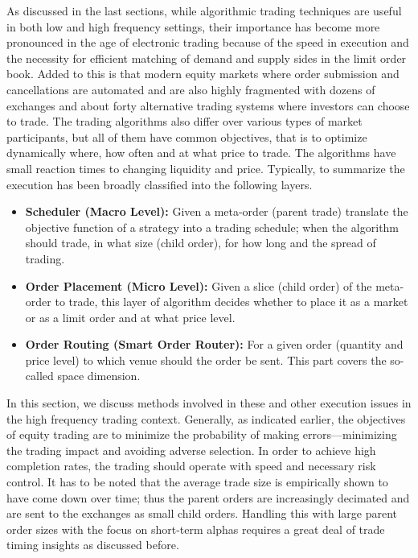 As discussed in the last sections, while algorithmic trading techniques are useful in both low and high frequency settings, their importance has become more pronounced in the age of electronic trading because of the speed in execution and the necessity for efficient matching of demand and supply sides in the limit order book. Added to this is that modern equity markets where order submission and cancellations are automated and are also highly fragmented with dozens of exchanges and about forty alternative trading systems where investors can choose to trade. The trading algorithms also differ over various types of market participants, but all of them have common objectives, that is to optimize dynamically where, how often and at what price to trade. The algorithms have small reaction times to changing liquidity and price. Typically, to summarize the execution has been broadly classified into the following layers.
	\begin{itemize}
	\item \textbf{Scheduler (Macro Level):} Given a meta-order (parent trade) translate the objective function of a strategy into a trading schedule; when the algorithm should trade, in what size (child order), for how long and the spread of trading.
	
	\item \textbf{Order Placement (Micro Level):} Given a slice (child order) of the meta-order to trade, this layer of algorithm decides whether to place it as a market or as a  limit order and at what price level.
	
	\item \textbf{Order Routing (Smart Order Router):} For a given order (quantity and price level) to which venue should the order be sent. This part covers the so-called space dimension.
	\end{itemize}


In this section, we discuss methods involved in these and other execution issues in the high frequency trading context. Generally, as indicated earlier, the objectives of equity trading are to minimize the probability of making errors---minimizing the trading impact and avoiding adverse selection. In order to achieve high completion rates, the trading should operate with speed and necessary risk control. It has to be noted that the average trade size is empirically shown to have come down over time; thus the parent orders are increasingly decimated and are sent to the exchanges as small child orders. Handling this with large parent order sizes with the focus on short-term alphas requires a great deal of trade timing insights as discussed before.


